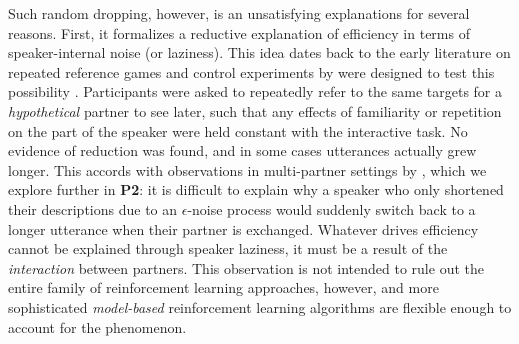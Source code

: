 Such random dropping, however, is an unsatisfying explanations for several reasons.
First, it formalizes a reductive explanation of efficiency in terms of speaker-internal noise (or laziness). This idea dates back to the early literature on repeated reference games and
control experiments by  were designed to test this possibility \cite<see also>{GarrodFayLeeOberlanderMacLeod07_GraphicalSymbolSystems}. 
Participants were asked to repeatedly refer to the same targets for a \emph{hypothetical} partner to see later, such that any effects of familiarity or repetition on the part of the speaker were held constant with the interactive task. 
No evidence of reduction was found, and in some cases utterances actually grew longer.
This accords with observations in multi-partner settings by , which we explore further in \textbf{P2}: it is difficult to explain why a speaker who only shortened their descriptions due to an $\epsilon$-noise process would suddenly switch back to a longer utterance when their partner is exchanged.
Whatever drives efficiency cannot be explained through speaker laziness, it must be a result of the \emph{interaction} between partners.
This observation is not intended to rule out the entire family of reinforcement learning approaches, however, and more sophisticated \emph{model-based} reinforcement learning algorithms are flexible enough to account for the phenomenon.

